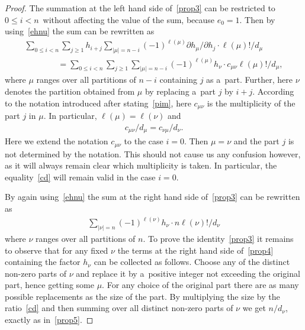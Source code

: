 \documentclass[pdftex]{sigma}
\numberwithin{equation}{section}
\renewcommand\ge{\geqslant}
\renewcommand\le{\leqslant}
\begin{document}
\begin{proof}
The summation at the left hand side of~\eqref{prop3} can be restricted to $0\le i<n$~without af\/fecting
the value of the sum, because $e_0=1$.
Then by using~\eqref{ehnu} the sum can be rewritten as
\begin{gather}
\sum_{0\le i<n}\sum_{j\ge1}h_{i+j}\sum_{|\mu|=n-i}(-1)^{\ell(\mu)}
\partial h_\mu/\partial h_j\cdot\ell(\mu)
!/d_\mu
\nonumber
\\
\qquad\qquad
=\sum_{0\le i<n}\sum_{j\ge1}\sum_{|\mu|=n-i}(-1)^{\ell(\mu)}h_\nu\cdot c_{\mu\nu}\ell(\mu)!/d_\mu,
\label{prop4}
\end{gather}
where $\mu$ ranges over all partitions of $n-i$ containing $j$ as a~part.
Further, here $\nu$ denotes the partition obtained from $\mu$ by replacing a~part $j$ by $i+j$.
According to the notation introduced after stating~\eqref{pim}, here $c_{\mu\nu}$ is the
multiplicity of the part $j$ in $\mu$.
In particular, $\ell(\mu)=\ell(\nu)$ and
\begin{gather}
\label{cd}
c_{\mu\nu}/d_\mu=c_{\nu\mu}
/d_\nu.
\end{gather}
Here  we extend the notation $c_{\mu\nu}$ to the case $i=0$.
Then $\mu=\nu$ and the part $j$ is not determined by the notation.
This should not cause us any confusion however, as it will always remain clear which multiplicity is taken.
In particular, the equality~\eqref{cd} will remain valid in the case $i=0$.

By again using~\eqref{ehnu} the sum at the right hand side of~\eqref{prop3} can be rewritten as
\begin{gather}
\label{prop5}
\sum_{|\nu|=n}(-1)^{\ell(\nu)}h_\nu\cdot n\ell(\nu)!/d_\nu
\end{gather}
where  $\nu$ ranges over all partitions of $n$.
To prove the identity~\eqref{prop3} it remains to observe that for any f\/ixed $\nu$ the terms at the right
hand side of~\eqref{prop4} containing the factor $h_\nu$ can be collected as follows.
Choose any of the distinct non-zero parts of $\nu$ and replace it by a~positive integer not exceeding the
original part, hence getting some $\mu$.
For any choice of the original part there are as many possible replacements as the size of the part.
By multiplying the size by the ratio~\eqref{cd} and then summing over all distinct non-zero parts of $\nu$
we get $n/d_\nu$, exactly as in~\eqref{prop5}.
\end{proof}
\end{document}
